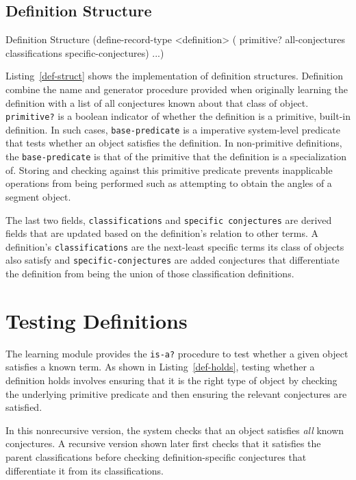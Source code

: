 \subsection{Definition Structure}

\begin{code-listing}
[label=def-struct]
{Definition Structure}
(define-record-type <definition>
  (%
                     primitive?
                     all-conjectures
                     classifications specific-conjectures) ...)
\end{code-listing}

Listing~\ref{def-struct} shows the implementation of definition
structures. Definition combine the name and generator procedure
provided when originally learning the definition with a list of all
conjectures known about that class of object. \texttt{primitive?} is a
boolean indicator of whether the definition is a primitive, built-in
definition. In such cases, \texttt{base-predicate} is a imperative
system-level predicate that tests whether an object satisfies the
definition. In non-primitive definitions, the \texttt{base-predicate}
is that of the primitive that the definition is a specialization
of. Storing and checking against this primitive predicate prevents
inapplicable operations from being performed such as attempting to
obtain the angles of a segment object.

The last two fields, \texttt{classifications} and \texttt{specific
  conjectures} are derived fields that are updated based on the
definition's relation to other terms. A definition's
\texttt{classifications} are the next-least specific terms its class
of objects also satisfy and \texttt{specific-conjectures} are added
conjectures that differentiate the definition from being the union of
those classification definitions.


\section{Testing Definitions}

The learning module provides the \texttt{is-a?} procedure to test
whether a given object satisfies a known term. As shown in
Listing~\ref{def-holds}, testing whether a definition holds involves
ensuring that it is the right type of object by checking the
underlying primitive predicate and then ensuring the relevant
conjectures are satisfied.

In this nonrecursive version, the system checks that an object
satisfies \emph{all} known conjectures. A recursive version shown
later first checks that it satisfies the parent classifications before
checking definition-specific conjectures that differentiate it from
its classifications.

